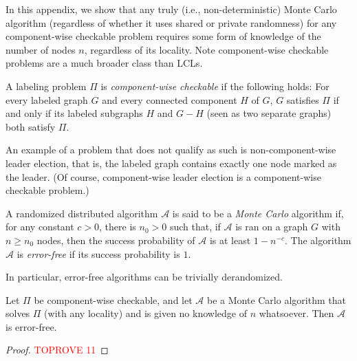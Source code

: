 \documentclass[11pt]{article}
\begin{document}
In this appendix, we show that any truly (i.e., non-deterministic) Monte Carlo
algorithm (regardless of whether it uses shared or private randomness) for any
component-wise checkable problem requires some form of knowledge of the number
of nodes $n$, regardless of its locality.
Note component-wise checkable problems are a much broader class than LCLs.

\begin{definition}
	A labeling problem $\Pi$ is \emph{component-wise checkable} if the following
	holds: 
	For every labeled graph $G$ and every connected component $H$ of $G$, $G$
	satisfies $\Pi$ if and only if its labeled subgraphs $H$ and $G - H$ (seen as
	two separate graphs) both satisfy $\Pi$.
\end{definition}

An example of a problem that does not qualify as such is non-component-wise
leader election, that is, the labeled graph contains exactly one node marked as
the leader.
(Of course, component-wise leader election is a component-wise checkable
problem.)

\begin{definition}\label{def:monte-carlo}
	A randomized distributed algorithm $\mathcal{A}$ is said to be a \emph{Monte
	Carlo} algorithm if, for any constant $c > 0$, there is $n_0 > 0$ such that,
	if $\mathcal{A}$ is ran on a graph $G$ with $n \ge n_0$ nodes, then the
	success probability of $\mathcal{A}$ is at least $1 - n^{-c}$.
	The algorithm $\mathcal{A}$ is \emph{error-free} if its success probability is
	$1$.
\end{definition}

In particular, error-free algorithms can be trivially derandomized.

\begin{theorem}
	Let $\Pi$ be component-wise checkable, and let $\mathcal{A}$ be a Monte Carlo
	algorithm that solves $\Pi$ (with any locality) and is given no knowledge of
	$n$ whatsoever.
	Then $\mathcal{A}$ is error-free.
\end{theorem}

\begin{proof}\textcolor{red}{TOPROVE 11}\end{proof}
\end{document}

